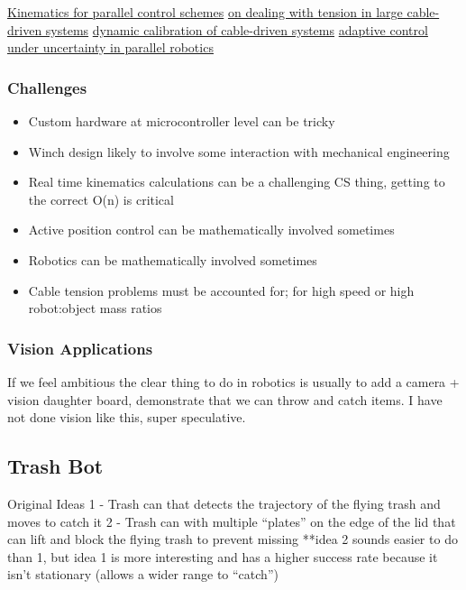 \documentclass[11pt]{article}
\begin{document}
\href{https://www.cambridge.org/core/services/aop-cambridge-core/content/view/B129C939BF4491AA693A36A54AE6D2C7/S0263574721001971a.pdf/full-dynamic-model-of-3-upu-translational-parallel-manipulator-for-model-based-control-schemes.pdf}{Kinematics for parallel control schemes}
\href{https://ieeexplore.ieee.org/stamp/stamp.jsp?arnumber=9737194}{on dealing with tension in large cable-driven systems}
\href{https://ieeexplore.ieee.org/stamp/stamp.jsp?arnumber=9737158}{dynamic calibration of cable-driven systems}
\href{https://arxiv.org/pdf/2003.08860.pdf}{adaptive control under uncertainty in parallel robotics}

\subsubsection{Challenges}
\label{sec:orgf332f81}

\begin{itemize}
\item Custom hardware at microcontroller level can be tricky
\item Winch design likely to involve some interaction with mechanical engineering
\item Real time kinematics calculations can be a challenging CS thing, getting to the correct O(n) is critical
\item Active position control can be mathematically involved sometimes
\item Robotics can be mathematically involved sometimes
\item Cable tension problems must be accounted for; for high speed or high robot:object mass ratios
\end{itemize}

\subsubsection{Vision Applications}
\label{sec:org0cb02fa}

If we feel ambitious the clear thing to do in robotics is usually to add a camera + vision daughter board, demonstrate that we can throw and catch items. I have not done vision like this, super speculative.


\subsection{Trash Bot}
\label{sec:orgde2954c}

Original Ideas
1 - Trash can that detects the trajectory of the flying trash and moves to catch it
2 - Trash can with multiple “plates” on the edge of the lid that can lift and block the flying trash to prevent missing
**idea 2 sounds easier to do than 1, but idea 1 is more interesting and has a higher success rate because it isn’t stationary (allows a wider range to “catch”)
\end{document}
